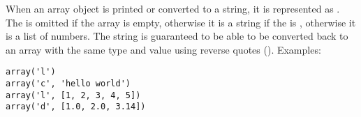 When an array object is printed or converted to a string, it is
represented as .  The
 is omitted if the array is empty, otherwise it is a
string if the  is , otherwise it is a list of
numbers.  The string is guaranteed to be able to be converted back to
an array with the same type and value using reverse quotes
().  Examples:

\bcode\begin{verbatim}
array('l')
array('c', 'hello world')
array('l', [1, 2, 3, 4, 5])
array('d', [1.0, 2.0, 3.14])
\end{verbatim}\ecode
